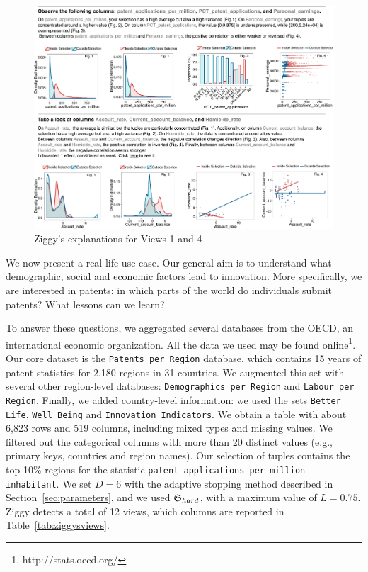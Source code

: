 \begin{figure}[!ht]
  \centering
  \includegraphics[width=2\columnwidth]{Figures/UseCase}
  \caption{Ziggy's explanations for Views 1 and 4}
  \label{pic:zigdetail}
\end{figure}
We now present a real-life use case. Our general aim is to understand what
demographic, social and economic factors lead to innovation. More specifically,
we are interested in patents: in which parts of the world do individuals
submit patents? What lessons can we learn?

To answer these questions, we aggregated several databases from the OECD, an
international economic organization. All the data we used may be found
online\footnote{http://stats.oecd.org/}. Our core dataset is the
\texttt{Patents per Region} database, which contains 15 years of patent statistics
for 2,180 regions in 31 countries. We augmented this set with several other
region-level databases: \texttt{Demographics per Region} and \texttt{Labour per
Region}. Finally, we added country-level information: we used the sets
\texttt{Better Life}, \texttt{Well Being} and \texttt{Innovation Indicators}.
We obtain a table with about 6,823 rows and 519 columns, including mixed types
and missing values. We filtered out the categorical columns with
more than 20 distinct values (e.g., primary keys, countries and region names).
Our selection of tuples contains the top 10\% regions for the statistic
\texttt{patent applications per million inhabitant}. We set $D=6$ with the
adaptive stopping method described in Section~\ref{sec:parameters}, and we used
$\mathfrak{S}_{hard}$, with a maximum value of $L=0.75$.
Ziggy detects a total of 12 views, which columns are reported in
Table~\ref{tab:ziggysviews}.

